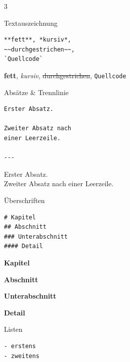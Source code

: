 \documentclass[a4paper,landscape,9pt]{extarticle}
\newcommand{\prevtxt}[1]{{\small #1}}
\begin{document}
\begin{multicols}{3}


\begin{mdcard}{Textauszeichnung}
\begin{lstlisting}[language=lia]
**fett**, *kursiv*,
~~durchgestrichen~~,
`Quellcode`
\end{lstlisting}
\tcblower
\prevtxt{\textbf{fett}, \textit{kursiv},
\sout{durchgestrichen}, \texttt{Quellcode}}
\end{mdcard}

\begin{mdcard}{Absätze \& Trennlinie}
\begin{lstlisting}[language=lia]
Erster Absatz.

Zweiter Absatz nach
einer Leerzeile.

---
\end{lstlisting}
\tcblower
\prevtxt{Erster Absatz.\\[3pt]
Zweiter Absatz nach einer Leerzeile.\\[2pt]
\textcolor{rulegray}{\hrulefill}}
\end{mdcard}

\begin{mdcard}{Überschriften}
\begin{lstlisting}[language=lia]
# Kapitel
## Abschnitt
### Unterabschnitt
#### Detail
\end{lstlisting}
\tcblower
{\large\bfseries Kapitel}\par\vspace{1pt}
{\normalsize\bfseries Abschnitt}\par\vspace{1pt}
{\small\bfseries Unterabschnitt}\par\vspace{1pt}
{\footnotesize\bfseries Detail}
\end{mdcard}

\begin{mdcard}{Listen}
\begin{lstlisting}[language=lia]
- erstens
- zweitens


\end{lstlisting}
\end{mdcard}
\end{multicols}
\end{document}
